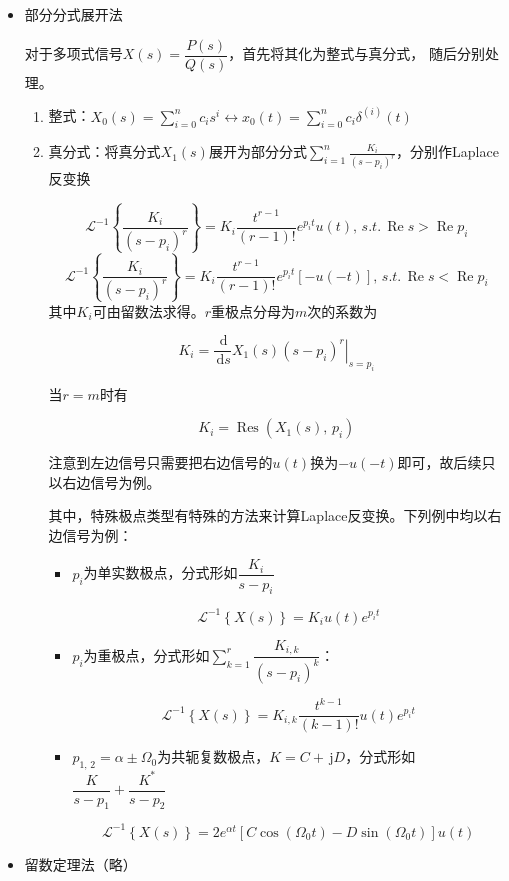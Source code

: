\documentclass[UTF8,fontset=fandol,zihao=5]{ctexart}
\newcommand{\jj}{\,\mathrm{j}}
\newcommand{\dd}{\,\mathrm{d}}
\newcommand{\LL}{\mathcal{L}}
\newcommand{\RRe}{\operatorname{Re}}
\newcommand{\Res}{\operatorname{Res}}
\begin{document}
\begin{methodbox}[【题型】Laplace反变换]
  \begin{itemize}
    \item 部分分式展开法
    
    对于多项式信号$X(s)=\dfrac{P(s)}{Q(s)}$，首先将其化为整式与真分式，
    随后分别处理。
    \begin{enumerate}[label=\arabic*.]
      \item 整式：$X_0(s)=\sum_{i=0}^{n}c_i s^i \longleftrightarrow x_0(t)=\sum_{i=0}^{n}c_i \delta^{(i)}(t)$
      \item 真分式：将真分式$X_1(s)$展开为部分分式$\displaystyle\sum_{i=1}^{n}\frac{K_i}{(s-p_i)^r}$，分别作Laplace反变换
      
      \[
      \LL^{-1}\left\{\frac{K_i}{(s-p_i)^r}\right\} = K_i \frac{t^{r-1}}{(r-1)!} e^{p_i t} u(t),\, s.t.\, \RRe s > \RRe p_i
      \]
      \[
      \LL^{-1}\left\{\frac{K_i}{(s-p_i)^r}\right\} = K_i \frac{t^{r-1}}{(r-1)!} e^{p_i t} [-u(-t)],\, s.t.\, \RRe s < \RRe p_i
      \]
      其中$K_i$可由留数法求得。$r$重极点分母为$m$次的系数为
      
      \[
      K_i=\frac{\dd}{\dd s}\left.X_1(s)(s-p_i)^r\right|_{s=p_i}
      \]
      
      当$r=m$时有

      \[
      K_i=\Res(X_1(s),\,p_i)
      \]

      注意到左边信号只需要把右边信号的$u(t)$换为$-u(-t)$即可，故后续只以右边信号为例。

      其中，特殊极点类型有特殊的方法来计算Laplace反变换。下列例中均以右边信号为例：
      \begin{itemize}
        \item $p_i$为单实数极点，分式形如$\dfrac{K_i}{s-p_i}$
        
        \[
        \LL^{-1}\left\{X(s)\right\}=K_i u(t) e^{p_i t}
        \]
        
        \item $p_i$为重极点，分式形如$\displaystyle\sum_{k=1}^{r}\dfrac{K_{i,k}}{(s-p_i)^k}$：
        
        \[
        \LL^{-1}\left\{X(s)\right\}=K_{i,k} \dfrac{t^{k-1}}{(k-1)!} u(t) e^{p_i t}
        \]
        
        \item $p_{1,\,2}=\alpha\pm\varOmega_0$为共轭复数极点，$K=C+\jj D$，分式形如$\dfrac{K}{s-p_1}+\dfrac{K^\ast}{s-p_2}$

        \[
        \LL^{-1}\left\{X(s)\right\}=2e^{\alpha t} \left[C\cos (\varOmega_0 t) - D\sin (\varOmega_0 t)\right]  u(t) 
        \]

      \end{itemize}
    \end{enumerate}
    \item 留数定理法（略）
  \end{itemize}
\end{methodbox}
\end{document}
